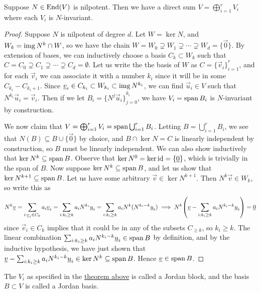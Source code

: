 \begin{theorem}\label{thm:jordan-canonical-nilpotent}
    Suppose \(N \in \operatorname{End}(V)\) is nilpotent.
    Then we have a direct sum \(V = \bigoplus_{i=1}^r V_i\)
    where each \(V_i\) is \(N\)-invariant.
\end{theorem}
\begin{proof}
    Suppose \(N\) is nilpotent of degree \(d\).
    Let \(W = \ker N\), and \(W_k = \operatorname{img} N^k \cap W\),
    so we have the chain
    \(W = W_0 \supsetneq W_1 \supsetneq \cdots \supsetneq W_d = \{\vec{0}\}\).
    By extension of bases,
    we can inductively choose a basis \(C_k \subset W_k\)
    such that \(C = C_0 \supsetneq C_1 \supsetneq \cdots \supsetneq C_d = \emptyset\).
    Let us write the the basis of \(W\) as \(C = {\{\vec{v}_i\}}_{i=1}^r\),
    and for each \(\vec{v}_i\) we can associate it with a number
    \(k_i\) since it will be in some \(C_{k_i} - C_{k_i+1}\).
    Since \(\underline{v}_i \in C_{k_i} \subset W_{k_i} \subset \operatorname{img} N^{k_i}\),
    we can find \(\vec{u}_i \in V\) such that \(N^{k_i}\vec{u}_i = \vec{v}_i\).
    Then if we let \(B_i = {\{N^j\vec{u}_i\}}_{j=0}^{k_i}\),
    we have \(V_i = \operatorname{span} B_i\) is \(N\)-invariant by construction.

    We now claim that \(V = \bigoplus_{i=1}^r V_i = \operatorname{span} \bigcup_{i=1}^r B_i\).
    Letting \(B = \bigcup_{i=1}^r B_i\),
    we see that \(N(B) \subseteq B \cup \{\vec{0}\}\) by choice,
    and \(B \cap \ker N = C\) is linearly independent by construction,
    so \(B\) must be linearly independent.
    We can also show inductively that \(\ker N^k \subseteq \operatorname{span} B\).
    Observe that \(\ker N^0 = \ker\operatorname{id} = \{\underline{0}\}\),
    which is trivially in the span of \(B\).
    Now suppose \(\ker N^k \subseteq \operatorname{span} B\),
    and let us show that \(\ker N^{k+1} \subseteq \operatorname{span} B\).
    Let us have some arbitrary \(\vec{v} \in \ker N^{k+1}\).
    Then \(N^k\vec{v} \in W_k\), so write this as
    \begin{equation*}
        N^k\vec{v} = \sum_{i: \vec{v}_i \in C_k} a_i\vec{v}_i
        = \sum_{i: k_i \geq k} a_i N^{k_i}\vec{u}_i
        = \sum_{i: k_i \geq k} a_i N^k (N^{k_i-k}\vec{u}_i)
        \implies N^k\pqty{\vec{v} - \sum_{i: k_i \geq k} a_i N^{k_i-k}\vec{u}_i} = \vec{0}
    \end{equation*}
    since \(\vec{v}_i \in C_k\) implies that
    it could be in any of the subsets \(C_{\geq k}\), so \(k_i \geq k\).
    The linear combination \(\sum_{i: k_i \geq k} a_i N^{k_i-k}\underline{u}_i \in \operatorname{span} B\) by definition,
    and by the inductive hypothesis,
    we have just shown that \(\underline{v} - \sum_{i: k_i \geq k} a_i N^{k_i-k}\underline{u}_i \in \ker N^k \subseteq \operatorname{span} B\).
    Hence \(\underline{v} \in \operatorname{span} B\).
\end{proof}
\begin{definition}
    The \(V_i\) as specified in the \hyperref[thm:jordan-canonical-nilpotent]{theorem above}
    is called a Jordan block,
    and the basis \(B \subset V\) is called a Jordan basis.
\end{definition}

